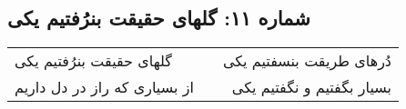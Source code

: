 \begin{center}
\section*{شماره ۱۱: گلهای حقیقت بنرُفتیم یکی}
\label{sec:011}
\begin{longtable}{l p{0.5cm} r}
گلهای حقیقت بنرُفتیم یکی
&&
دُرهای طریقت بنسفتیم یکی
\\
از بسیاری که راز در دل داریم
&&
بسیار بگفتیم و نگفتیم یکی
\\
\end{longtable}
\end{center}
